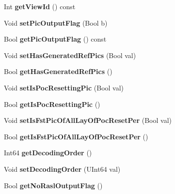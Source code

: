 \begin{DoxyCompactItemize}
Int {\bfseries get\+View\+Id} () const
\item 
\mbox{\label{class_t_com_pic_ac47eca624b3a5b34681cdd70470281af}} 
Void {\bfseries set\+Pic\+Output\+Flag} (Bool b)
\item 
\mbox{\label{class_t_com_pic_a4cd30187aeb3e7312cf26ef0dcd0c028}} 
Bool {\bfseries get\+Pic\+Output\+Flag} () const
\item 
\mbox{\label{class_t_com_pic_aba8449697473d80ba12aead5046473f0}} 
Void {\bfseries set\+Has\+Generated\+Ref\+Pics} (Bool val)
\item 
\mbox{\label{class_t_com_pic_a612cc5096eb1b8b3151020d0cbb14907}} 
Bool {\bfseries get\+Has\+Generated\+Ref\+Pics} ()
\item 
\mbox{\label{class_t_com_pic_ac687b719ce53a2418cfcabd723ce8fd0}} 
Void {\bfseries set\+Is\+Poc\+Resetting\+Pic} (Bool val)
\item 
\mbox{\label{class_t_com_pic_a6933a8000ac0889f8d2e9454a1215752}} 
Bool {\bfseries get\+Is\+Poc\+Resetting\+Pic} ()
\item 
\mbox{\label{class_t_com_pic_ade873796e542a3a87ade0495d705777a}} 
Void {\bfseries set\+Is\+Fst\+Pic\+Of\+All\+Lay\+Of\+Poc\+Reset\+Per} (Bool val)
\item 
\mbox{\label{class_t_com_pic_a1fc499666fc0d2b3dc19c19758e2231a}} 
Bool {\bfseries get\+Is\+Fst\+Pic\+Of\+All\+Lay\+Of\+Poc\+Reset\+Per} ()
\item 
\mbox{\label{class_t_com_pic_af7862f5d424983584bce5bdd01b50c0e}} 
Int64 {\bfseries get\+Decoding\+Order} ()
\item 
\mbox{\label{class_t_com_pic_a68667e648bacae1bfe372ca776cff50d}} 
Void {\bfseries set\+Decoding\+Order} (U\+Int64 val)
\item 
\mbox{\label{class_t_com_pic_a56749637cb995de31f726572ee9206d7}} 
Bool {\bfseries get\+No\+Rasl\+Output\+Flag} ()
\item 

\end{DoxyCompactItemize}
